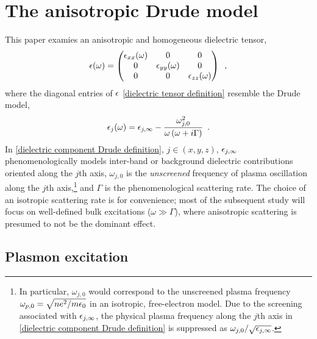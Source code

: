 \section{The anisotropic Drude model}

This paper examies an anisotropic and homogeneous dielectric tensor,
\begin{equation}
    \label{dielectric tensor definition}
    \epsilon(\omega) = \begin{pmatrix}
    \epsilon_{xx}(\omega) & 0 & 0
    \\ 0 & \epsilon_{yy}(\omega) & 0
    \\ 0 & 0 & \epsilon_{zz}(\omega)
    \end{pmatrix}
    \,\,\,,
\end{equation}
where the diagonal entries of $\epsilon$ \eqref{dielectric tensor definition} resemble the Drude model,
\begin{equation}
    \label{dielectric component Drude definition}
    \epsilon_j(\omega) = \epsilon_{j,\infty}-\frac{\omega_{j,0}^2}{\omega\left(\omega+i\Gamma\right)}\,\,\,.
\end{equation}
In \eqref{dielectric component Drude definition}, $j\in(x,y,z)$, $\epsilon_{j,\infty}$ phenomenologically models inter-band or background dielectric contributions oriented along the $j$th axis, $\omega_{j,0}$ is the {\it unscreened} frequency of plasma oscillation along the $j$th axis,\footnote{In particular, $\omega_{j,0}$ would correspond to the unscreened plasma frequency $\omega_{p,0}=\sqrt{ne^2/m\epsilon_0}$ in an isotropic, free-electron model.  Due to the screening associated with $\epsilon_{j,\infty}$, the physical plasma frequency along the $j$th axis in \eqref{dielectric component Drude definition} is suppressed as $\omega_{j,0}/\sqrt{\epsilon_{j,\infty}}$.} and $\Gamma$ is the phenomenological scattering rate.  The choice of an isotropic scattering rate is for convenience; most of the subsequent study will focus on well-defined bulk excitations ($\omega\gg\Gamma$), where anisotropic scattering is presumed to not be the dominant effect.






\subsection{Plasmon excitation}

